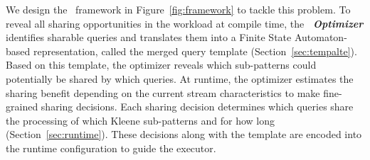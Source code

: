 We design the \app\ framework in Figure~\ref{fig:framework} to tackle this problem.
% 
To reveal all sharing opportunities in the workload at compile time, the \textbf{\textit{\app\ Optimizer}} identifies sharable queries and translates them into a Finite State Automaton-based representation, called the merged query template (Section~\ref{sec:tempalte}).
Based on this template, the optimizer reveals which sub-patterns could potentially be shared by which queries.
At runtime, the optimizer estimates the sharing benefit depending on the current stream characteristics to make fine-grained sharing decisions. Each sharing decision determines which queries share the processing of which Kleene sub-patterns and for how long (Section~\ref{sec:runtime}). 
These decisions along with the template are encoded into the runtime configuration to guide the executor.


